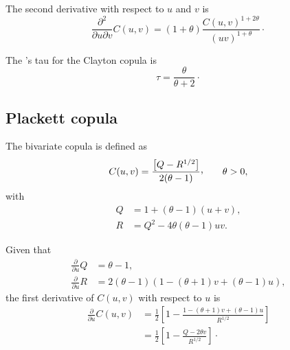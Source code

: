 \documentclass{article}
\def\ccom{\raisebox{.45ex}{\textrm{,}}}
\begin{document}
The second derivative with respect to $u$ and $v$ is 
\begin{equation}
    \frac{\partial^2}{\partial u\partial v}C(u,v)
        = (1+\theta) \frac{
            C(u, v)^{1+2\theta}
        }{
            (uv)^{1+\theta}
        }\cdot
\end{equation}

The \cite{Kendall38}'s tau for the Clayton copula is
\begin{equation}
    \tau = \frac\theta{\theta+2}\cdot
\end{equation}


\subsection*{Plackett copula}
The bivariate \cite{Plackett65} copula is defined as
\begin{equation}
    C(u,v)= \frac{
        \left[ Q - R^{1/2} \right]
    }{
        2 (\theta - 1)
    }\ccom \qquad \theta > 0,
\end{equation}
with
\begin{align}
    Q &= 1 +(\theta-1)(u+v),
        \nonumber\\
    R &= Q^2 - 4 \theta(\theta-1)uv.
\end{align}

Given that
\begin{align}
    \frac{\partial}{\partial u} Q &= \theta - 1,\\
    \frac{\partial}{\partial u} R &= 2(\theta-1) \left(
        1 - (\theta+1) v + (\theta-1) u
    \right),
\end{align}
the first derivative of $C(u, v)$ with respect to $u$ is 
\begin{align}
    \frac{\partial}{\partial u}C(u,v)
    &=\frac12\left[1-\frac{
        1 - (\theta+1) v + (\theta-1) u
    }{R^{1/2}}\right]
        \nonumber\\
    &=\frac12\left[1-\frac{
        Q - 2\theta v
    }{R^{1/2}}\right]\cdot
\end{align}
\end{document}
